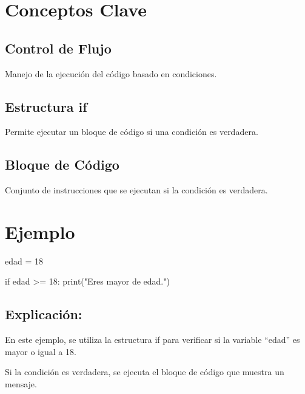 \documentclass[
  a4paper,
  DIV=11,
  numbers=noendperiod,
  onepage,
  openany]{scrreprt}
\newenvironment{Shaded}{\begin{snugshade}}{\end{snugshade}}
\newcommand{\BuiltInTok}[1]{\textcolor[rgb]{0.00,0.23,0.31}{#1}}
\newcommand{\ControlFlowTok}[1]{\textcolor[rgb]{0.00,0.23,0.31}{#1}}
\newcommand{\DecValTok}[1]{\textcolor[rgb]{0.68,0.00,0.00}{#1}}
\newcommand{\NormalTok}[1]{\textcolor[rgb]{0.00,0.23,0.31}{#1}}
\newcommand{\OperatorTok}[1]{\textcolor[rgb]{0.37,0.37,0.37}{#1}}
\newcommand{\StringTok}[1]{\textcolor[rgb]{0.13,0.47,0.30}{#1}}
\begin{document}
\section{Conceptos Clave}\label{conceptos-clave-12}

\subsection{Control de Flujo}\label{control-de-flujo}

Manejo de la ejecución del código basado en condiciones.

\subsection{Estructura if}\label{estructura-if}

Permite ejecutar un bloque de código si una condición es verdadera.

\subsection{Bloque de Código}\label{bloque-de-cuxf3digo}

Conjunto de instrucciones que se ejecutan si la condición es verdadera.

\section{Ejemplo}\label{ejemplo-7}

\begin{Shaded}
\begin{Highlighting}[]
\NormalTok{edad }\OperatorTok{=} \DecValTok{18}

\ControlFlowTok{if}\NormalTok{ edad }\OperatorTok{\textgreater{}=} \DecValTok{18}\NormalTok{:}
    \BuiltInTok{print}\NormalTok{(}\StringTok{"Eres mayor de edad."}\NormalTok{)}
\end{Highlighting}
\end{Shaded}

\subsection{Explicación:}\label{explicaciuxf3n-16}

En este ejemplo, se utiliza la estructura if para verificar si la
variable ``edad'' es mayor o igual a 18.

Si la condición es verdadera, se ejecuta el bloque de código que muestra
un mensaje.
\end{document}
